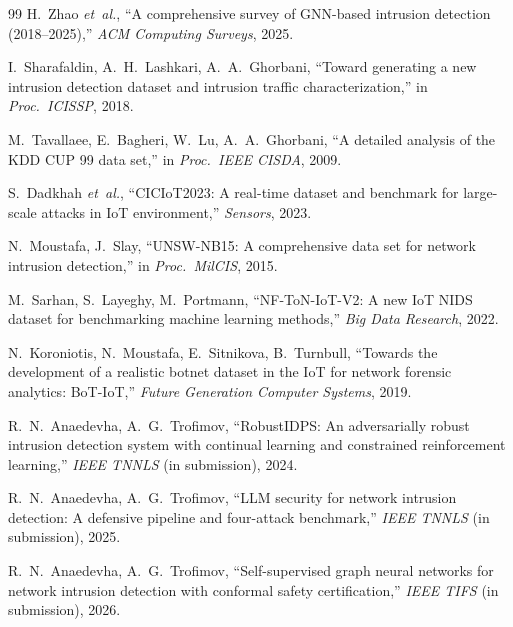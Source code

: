 \documentclass[journal,twoside]{IEEEtran}
\begin{document}
\begin{thebibliography}{99}
H.~Zhao \emph{et~al.},
``A comprehensive survey of GNN-based intrusion detection
(2018--2025),'' \emph{ACM Computing Surveys}, 2025.

I.~Sharafaldin, A.~H.~Lashkari, A.~A.~Ghorbani,
``Toward generating a new intrusion detection dataset and intrusion
traffic characterization,'' in \emph{Proc.\ ICISSP}, 2018.

M.~Tavallaee, E.~Bagheri, W.~Lu, A.~A.~Ghorbani,
``A detailed analysis of the KDD CUP 99 data set,'' in
\emph{Proc.\ IEEE CISDA}, 2009.

S.~Dadkhah \emph{et~al.},
``CICIoT2023: A real-time dataset and benchmark for large-scale attacks
in IoT environment,'' \emph{Sensors}, 2023.

N.~Moustafa, J.~Slay,
``UNSW-NB15: A comprehensive data set for network intrusion detection,''
in \emph{Proc.\ MilCIS}, 2015.

M.~Sarhan, S.~Layeghy, M.~Portmann,
``NF-ToN-IoT-V2: A new IoT NIDS dataset for benchmarking machine learning
methods,'' \emph{Big Data Research}, 2022.

N.~Koroniotis, N.~Moustafa, E.~Sitnikova, B.~Turnbull,
``Towards the development of a realistic botnet dataset in the IoT for
network forensic analytics: BoT-IoT,''
\emph{Future Generation Computer Systems}, 2019.

R.~N.~Anaedevha, A.~G.~Trofimov,
``RobustIDPS: An adversarially robust intrusion detection system with
continual learning and constrained reinforcement learning,''
\emph{IEEE TNNLS} (in submission), 2024.

R.~N.~Anaedevha, A.~G.~Trofimov,
``LLM security for network intrusion detection: A defensive pipeline
and four-attack benchmark,''
\emph{IEEE TNNLS} (in submission), 2025.

R.~N.~Anaedevha, A.~G.~Trofimov,
``Self-supervised graph neural networks for network intrusion detection
with conformal safety certification,''
\emph{IEEE TIFS} (in submission), 2026.

\end{thebibliography}
\end{document}
